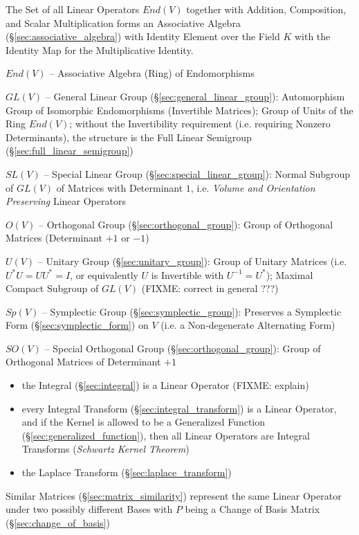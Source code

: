 The Set of all Linear Operators $End(V)$ together with Addition, Composition,
and Scalar Multiplication forms an Associative Algebra
(\S\ref{sec:associative_algebra}) with Identity Element over the Field $K$ with
the Identity Map for the Multiplicative Identity.

$End(V)$ -- Associative Algebra (Ring) of Endomorphisms

$GL(V)$ -- General Linear Group (\S\ref{sec:general_linear_group}):
Automorphism Group of Isomorphic Endomorphisms (Invertible Matrices); Group of
Units of the Ring $End(V)$; without the Invertibility requirement (i.e.
requiring Nonzero Determinants), the structure is the Full Linear Semigroup
(\S\ref{sec:full_linear_semigroup})

$SL(V)$ -- Special Linear Group (\S\ref{sec:special_linear_group}): Normal
Subgroup of $GL(V)$ of Matrices with Determinant $1$, i.e. \emph{Volume and
  Orientation Preserving} Linear Operators

$O(V)$ -- Orthogonal Group (\S\ref{sec:orthogonal_group}): Group of Orthogonal
Matrices (Determinant $+1$ or $-1$)

$U(V)$ -- Unitary Group (\S\ref{sec:unitary_group}): Group of Unitary Matrices
(i.e. $U^*U = UU^* = I$, or equivalently $U$ is Invertible with $U^{-1} =
U^*$); Maximal Compact Subgroup of $GL(V)$ (FIXME: correct in general ???)

$Sp(V)$ -- Symplectic Group (\S\ref{sec:symplectic_group}): Preserves a
Symplectic Form (\S\ref{sec:symplectic_form}) on $V$ (i.e. a Non-degenerate
Alternating Form)

$SO(V)$ -- Special Orthogonal Group (\S\ref{sec:orthogonal_group}): Group of
Orthogonal Matrices of Determinant $+1$

\begin{itemize}
  \item the Integral (\S\ref{sec:integral}) is a Linear Operator (FIXME:
    explain)
  \item every Integral Transform (\S\ref{sec:integral_transform}) is a Linear
    Operator, and if the Kernel is allowed to be a Generalized Function
    (\S\ref{sec:generalized_function}), then all Linear Operators are Integral
    Transforms (\emph{Schwartz Kernel Theorem})
  \item the Laplace Transform (\S\ref{sec:laplace_transform})
\end{itemize}

Similar Matrices (\S\ref{sec:matrix_similarity}) represent the same Linear
Operator under two possibly different Bases with $P$ being a Change of Basis
Matrix (\S\ref{sec:change_of_basis})




